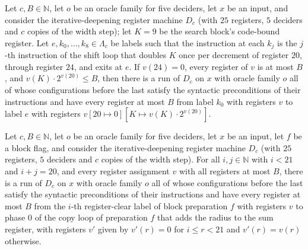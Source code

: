 \begin{theorem}
\label{Complexity.LogProg.SavitchARM.dp_shl}
\leanok
{}
Let $c,B\in\mathbb{N}$, let $o$ be an oracle family for five deciders, let $x$ be an input, and
consider the iterative-deepening register machine $D_c$ (with $25$ registers, $5$ deciders and $c$ copies of the width step); let $K=9$ be the search block's code-bound register. Let $e,k_0,\dots,k_8\in\Lambda_c$
be labels such that the instruction at each $k_j$ is the $j$-th instruction of the shift loop that
doubles $K$ once per decrement of register $20$, through register $24$, and exits at $e$. If
$v(24)=0$, every register of $v$ is at most $B$, and $v(K)\cdot 2^{v(20)}\le B$, then there is
a run of $D_c$ on $x$ with oracle family $o$ all of whose configurations before the last satisfy the syntactic preconditions of their instructions and have every register at most $B$ from label $k_0$ with registers $v$ to label $e$ with registers
$v[20\mapsto 0][K\mapsto v(K)\cdot 2^{v(20)}]$.
\end{theorem}

\begin{theorem}
\label{Complexity.LogProg.SavitchARM.dp_cb_run}
\leanok
{}
Let $c,B\in\mathbb{N}$, let $o$ be an oracle family for five deciders, let $x$ be an input, let
$f$ be a block flag, and consider the iterative-deepening register machine $D_c$ (with $25$ registers, $5$ deciders and $c$ copies of the width step). For all $i,j\in\mathbb{N}$ with $i<21$ and $i+j=20$, and
every register assignment $v$ with all registers at most $B$, there is a run of $D_c$ on $x$ with oracle family $o$ all of whose configurations before the last satisfy the syntactic preconditions of their instructions and have every register at most $B$ from the $i$-th
register-clear label of block preparation $f$ with registers $v$ to phase $0$ of the copy loop of
preparation $f$ that adds the radius to the sum register, with registers $v'$ given by $v'(r)=0$ for
$i\le r<21$ and $v'(r)=v(r)$ otherwise.
\end{theorem}

